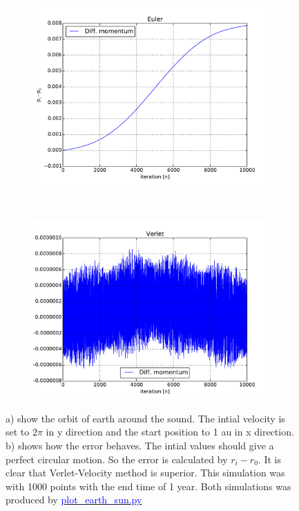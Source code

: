 \begin{figure}[H]
    \centering
    \begin{subfigure}{0.5\textwidth}
        \centering
        \includegraphics[width=\linewidth]{result/bilder/momentum-euler.pdf}
    	\caption{}
    \end{subfigure}%
    ~ 
    \begin{subfigure}{0.5\textwidth}
        \centering
        \includegraphics[width=\linewidth]{result/bilder/momentum-verlet.pdf}
        \caption{}
    \end{subfigure}
    \caption{a) show the orbit of earth around the sound. The intial velocity is set to $2\pi$ in y direction and the start position to 1 au in x direction. b) shows how the error behaves. The intial values should give a perfect circular motion. So the error is calculated by $r_i - r_{0}$. It is clear that Verlet-Velocity method is superior. This simulation was with 1000 points with the end time of 1 year. Both simulations was produced by \href{https://github.com/erikfsk/Project-3/blob/master/Project3/3a/plot_earth_sun.py}{\textcolor{blue}{plot\_earth\_sun.py}}}
    \label{fig:conserved-momentum}
\end{figure}
